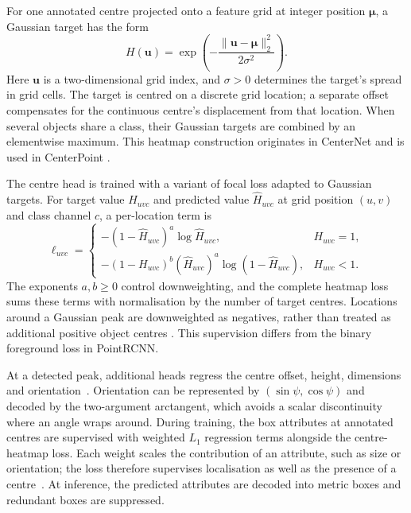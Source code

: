 For one annotated centre projected onto a feature grid at integer position
$\boldsymbol\mu$, a Gaussian target has the form
\begin{equation}
 H(\mathbf u)=\exp\left(-\frac{\|\mathbf u-\boldsymbol\mu\|_2^2}
 {2\sigma^2}\right).
 \label{eq:heatmap}
\end{equation}
Here $\mathbf u$ is a two-dimensional grid index, and $\sigma>0$ determines
the target's spread in grid cells. The target is centred on a discrete grid
location; a separate offset compensates for the continuous centre's
displacement from that location. When several objects share a class,
their Gaussian targets are combined by an elementwise maximum. This
heatmap construction originates in CenterNet and is used in CenterPoint
\cite{yin2021centerpoint,zhou2019objectsaspoints}.

The centre head is trained with a variant of focal loss adapted to Gaussian
targets. For target value $H_{uvc}$ and predicted value $\hat H_{uvc}$ at
grid position $(u,v)$ and class channel $c$, a per-location term is
\begin{equation}
 \ell_{uvc}=
 \begin{cases}
 -(1-\hat H_{uvc})^a\log\hat H_{uvc},&H_{uvc}=1,\\
 -(1-H_{uvc})^b(\hat H_{uvc})^a\log(1-\hat H_{uvc}),&H_{uvc}<1.
 \end{cases}
 \label{eq:center_heatmap_loss}
\end{equation}
The exponents $a,b\ge0$ control downweighting, and the complete heatmap
loss sums these terms with normalisation by the number of target centres.
Locations around a Gaussian peak are downweighted as negatives, rather
than treated as additional positive object centres
\cite{zhou2019objectsaspoints}. This supervision differs from the binary
foreground loss in PointRCNN.

At a detected peak, additional heads regress the centre offset, height,
dimensions and orientation~\cite{yin2021centerpoint}. Orientation can be represented
by $(\sin\psi,\cos\psi)$ and decoded by the two-argument arctangent,
which avoids a scalar discontinuity where an angle wraps around.
During training, the box attributes at annotated centres are supervised
with weighted $L_1$ regression terms alongside the centre-heatmap loss.
Each weight scales the contribution of an attribute, such as size or
orientation; the loss therefore supervises localisation as well as the
presence of a centre~\cite{yin2021centerpoint}. At inference, the predicted
attributes are decoded into metric boxes and redundant boxes are
suppressed.

